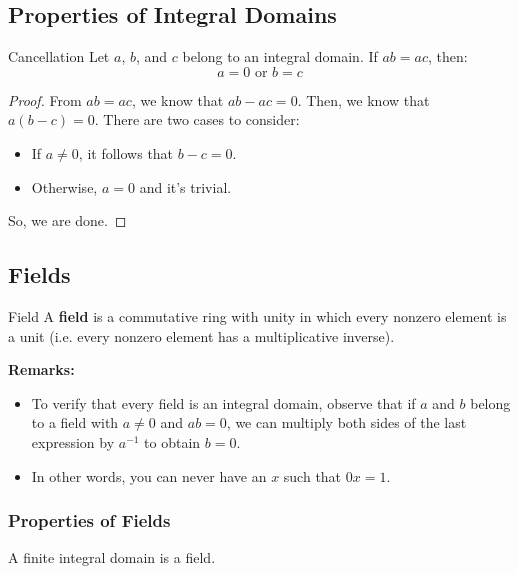 \documentclass[letterpaper]{article}
\begin{document}
\subsection{Properties of Integral Domains}
\begin{theorem}{Cancellation}{}
    Let $a$, $b$, and $c$ belong to an integral domain. If $ab = ac$, then: 
    \[a = 0 \text{ or } b = c\]
\end{theorem}
\begin{mdframed}[]
    \begin{proof}
        From $ab = ac$, we know that $ab - ac = 0$. Then, we know that $a(b - c) = 0$. There are two cases to consider:
        \begin{itemize}
            \item If $a \neq 0$, it follows that $b - c = 0$.
            \item Otherwise, $a = 0$ and it's trivial.
        \end{itemize}
        So, we are done. 
    \end{proof}
\end{mdframed}


\subsection{Fields}
\begin{definition}{Field}{}
    A \textbf{field} is a commutative ring with unity in which every nonzero element is a unit (i.e. every nonzero element has a multiplicative inverse).
\end{definition}
\textbf{Remarks:} 
\begin{itemize}
    \item To verify that every field is an integral domain, observe that if $a$ and $b$ belong to a field with $a \neq 0$ and $ab = 0$, we can multiply both sides of the last expression by $a^{-1}$ to obtain $b = 0$.
    \item In other words, you can never have an $x$ such that $0x = 1$. 
\end{itemize}


\subsubsection{Properties of Fields}
\begin{theorem}{}{}
    A finite integral domain is a field.
\end{theorem}
\end{document}
